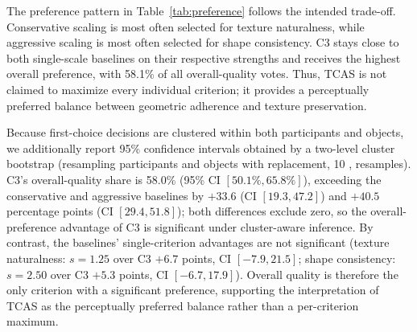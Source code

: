 \documentclass[times,twocolumn,final]{elsarticle}
\providecommand{\DIFadd}[1]{{\protect\color{red} \sf #1}} %
\providecommand{\DIFaddbegin}{} %
\providecommand{\DIFaddend}{} %
\providecommand{\DIFaddFL}[1]{\DIFadd{#1}} %
\newcommand{\DIFaddincludegraphics}[2][]{{\color{red}\fbox{\DIFOincludegraphics[#1]{#2}}}} %
\DeclareRobustCommand{\DIFaddbegin}{\DIFOaddbegin \let\includegraphics\DIFaddincludegraphics} %
\DeclareRobustCommand{\DIFaddend}{\DIFOaddend \let\includegraphics\DIFOincludegraphics} %
\begin{document}
\begin{table}[!htbp]
\centering
\caption{\DIFaddFL{Blinded three-alternative first-choice preference study. Percentages are computed over 720 valid decisions per criterion.}}
\label{tab:preference}
\end{table}
\DIFaddend \FloatBarrier

\DIFaddbegin \DIFadd{The preference pattern in Table~\ref{tab:preference} follows the intended trade-off. Conservative scaling is most often selected for texture naturalness, while aggressive scaling is most often selected for shape consistency. C3 stays close to both single-scale baselines on their respective strengths and receives the highest overall preference, with 58.1\% of all overall-quality votes. Thus, TCAS is not claimed to maximize every individual criterion; it provides a perceptually preferred balance between geometric adherence and texture preservation.
}

\DIFadd{Because first-choice decisions are clustered within both participants and objects, we additionally report 95\% confidence intervals obtained by a two-level cluster bootstrap (resampling participants and objects with replacement, 10}{\DIFadd{,}}\DIFadd{000 resamples). C3's overall-quality share is 58.0\% (95\% CI $[50.1\%, 65.8\%]$), exceeding the conservative and aggressive baselines by $+33.6$ (CI $[19.3, 47.2]$) and $+40.5$ percentage points (CI $[29.4, 51.8]$); both differences exclude zero, so the overall-preference advantage of C3 is significant under cluster-aware inference. By contrast, the baselines' single-criterion advantages are not significant (texture naturalness: $s = 1.25$ over C3 $+6.7$ points, CI $[-7.9, 21.5]$; shape consistency: $s = 2.50$ over C3 $+5.3$ points, CI $[-6.7, 17.9]$). Overall quality is therefore the only criterion with a significant preference, supporting the interpretation of TCAS as the perceptually preferred balance rather than a per-criterion maximum.
}
\end{document}
